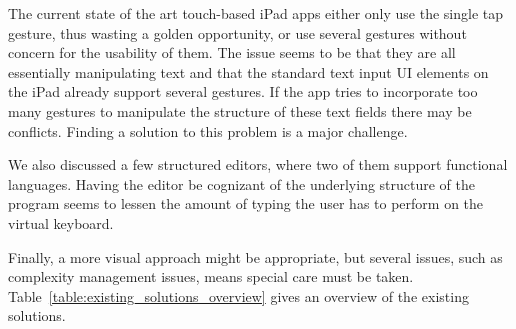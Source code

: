 The current state of the art touch-based iPad apps either only use the single tap gesture, thus wasting a golden opportunity, or use several gestures without concern for the usability of them. 
The issue seems to be that they are all essentially manipulating text and that the standard text input UI elements on the iPad already support several gestures. 
If the app tries to incorporate too many gestures to manipulate the structure of these text fields there may be conflicts. 
Finding a solution to this problem is a major challenge.

We also discussed a few structured editors, where two of them support functional languages. 
Having the editor be cognizant of the underlying structure of the program seems to lessen the amount of typing the user has to perform on the virtual keyboard. 

Finally, a more visual approach might be appropriate, but several issues, such as complexity management issues, means special care must be taken.
Table~\ref{table:existing_solutions_overview} gives an overview of the existing solutions.

